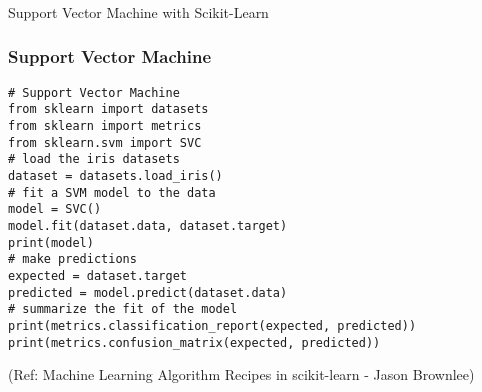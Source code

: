 \begin{frame}[fragile]\frametitle{}
\begin{center}
{\Large Support Vector Machine with Scikit-Learn}
\end{center}
\end{frame}

\begin{frame}[fragile]\frametitle{Support Vector Machine}
\begin{lstlisting}
# Support Vector Machine
from sklearn import datasets
from sklearn import metrics
from sklearn.svm import SVC
# load the iris datasets
dataset = datasets.load_iris()
# fit a SVM model to the data
model = SVC()
model.fit(dataset.data, dataset.target)
print(model)
# make predictions
expected = dataset.target
predicted = model.predict(dataset.data)
# summarize the fit of the model
print(metrics.classification_report(expected, predicted))
print(metrics.confusion_matrix(expected, predicted))
\end{lstlisting}

{\tiny (Ref: Machine Learning Algorithm Recipes in scikit-learn - Jason Brownlee)}

\end{frame}







